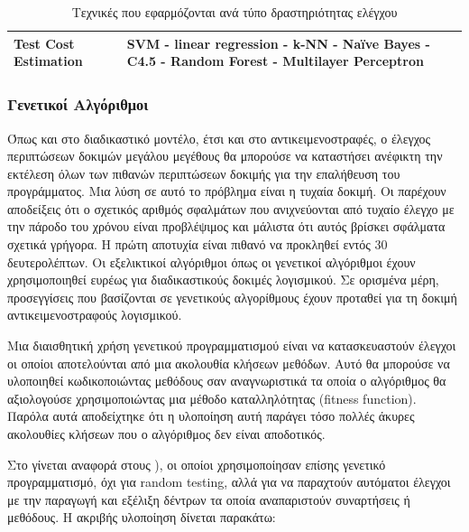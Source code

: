 \documentclass[12pt]{article}
\begin{document}
\begin{table}[]
\begin{tabular}{|p{5cm}|p{10cm}|}
Test Cost Estimation               & SVM - linear regression - k-NN - Naïve Bayes - C4.5 - Random Forest - Multilayer Perceptron                                                                                                                                                                                                            \\ \hline
\end{tabular}
\caption{Τεχνικές που εφαρμόζονται ανά τύπο δραστηριότητας ελέγχου}
\end{table}


\subsubsection{Γενετικοί Αλγόριθμοι}

Όπως και στο διαδικαστικό μοντέλο, έτσι και στο αντικειμενοστραφές, ο έλεγχος περιπτώσεων δοκιμών μεγάλου μεγέθους θα μπορούσε να καταστήσει ανέφικτη την εκτέλεση όλων των πιθανών περιπτώσεων δοκιμής για την επαλήθευση του προγράμματος. Μια λύση σε αυτό το πρόβλημα είναι η τυχαία δοκιμή. Οι \textcite{ciupa} παρέχουν αποδείξεις ότι ο σχετικός αριθμός σφαλμάτων που ανιχνεύονται από τυχαίο έλεγχο με την πάροδο του χρόνου είναι προβλέψιμος και μάλιστα ότι αυτός βρίσκει σφάλματα σχετικά γρήγορα. Η πρώτη αποτυχία είναι πιθανό να προκληθεί εντός 30 δευτερολέπτων. Οι εξελικτικοί αλγόριθμοι όπως οι γενετικοί αλγόριθμοι έχουν χρησιμοποιηθεί ευρέως για διαδικαστικούς δοκιμές λογισμικού. Σε ορισμένα μέρη, προσεγγίσεις που βασίζονται σε γενετικούς αλγορίθμους έχουν προταθεί για τη δοκιμή αντικειμενοστραφούς λογισμικού.

\par Μια διαισθητική χρήση γενετικού προγραμματισμού είναι να κατασκευαστούν έλεγχοι οι οποίοι αποτελούνται από μια ακολουθία κλήσεων μεθόδων. Αυτό θα μπορούσε να υλοποιηθεί κωδικοποιώντας μεθόδους σαν αναγνωριστικά τα οποία ο αλγόριθμος θα αξιολογούσε χρησιμοποιώντας μια μέθοδο καταλληλότητας (fitness function). Παρόλα αυτά αποδείχτηκε ότι η υλοποίηση αυτή παράγει τόσο πολλές άκυρες ακολουθίες κλήσεων που ο αλγόριθμος δεν είναι αποδοτικός.

\par Στο \textcite{meziane} γίνεται αναφορά στους \textcite{wappler}), οι οποίοι χρησιμοποίησαν επίσης γενετικό προγραμματισμό, όχι για random testing, αλλά για να παραχτούν αυτόματοι έλεγχοι με την παραγωγή και εξέλιξη δέντρων τα οποία αναπαριστούν συναρτήσεις ή μεθόδους. Η ακριβής υλοποίηση δίνεται παρακάτω:
\end{document}
